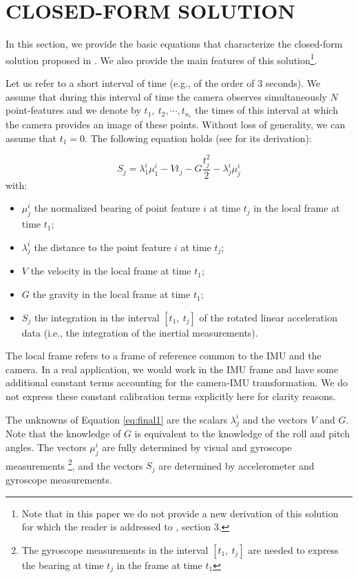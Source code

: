 \documentclass[letterpaper, 10 pt, conference]{ieeeconf}  %
\begin{document}
\section{CLOSED-FORM SOLUTION}\label{SectionCFS}

In this section, we provide the basic equations that characterize the closed-form solution proposed in  \cite{Martinelli2014}. We also provide the main features of this solution\footnote{Note that in this paper we do not provide a new derivation of this solution for which the reader is addressed to \cite{Martinelli2014}, section 3.}.

Let us refer to a short interval of time (e.g., of the order of $3$ seconds). We assume that during this interval of time the camera observes simultaneously $N$ point-features and we denote by $t_1,~t_2,\cdots,t_{n_i}$ the times of this interval at which the camera provides an image of these points. Without loss of generality, we can assume that $t_1=0$.
The following equation holds (see \cite{Martinelli2014} for its derivation):


\begin{equation} \label{eq:final1}
S_j = \lambda_1^i\mu_1^i - V t_j - G \frac{t_j^2}{2} - \lambda^i_j \mu^i_j
\end{equation}
\noindent with:
\begin{itemize}
\item $\mu_j^i$ the normalized bearing of point feature $i$ at time $t_j$ in the local frame at time $t_1$;
\item $\lambda_j^i$ the distance to the point feature $i$ at time $t_j$;
\item $V$ the velocity in the local frame at time $t_1$;
\item $G$ the gravity in the local frame  at time $t_1$;
\item $S_j$ the integration in the interval $[t_1, ~t_j]$ of the rotated linear acceleration data (i.e., the integration of the inertial measurements).
\end{itemize}


The local frame refers to a frame of reference common to the IMU and the camera.
In a real application, we would work in the IMU frame and have some additional constant terms
accounting for the camera-IMU transformation.
We do not express these constant calibration terms explicitly here for clarity reasons.

The unknowns of Equation \ref{eq:final1} are the scalars $\lambda_j^i$ and the vectors $V$ and $G$.
Note that the knowledge of $G$ is equivalent to the knowledge of the roll and pitch angles.
The vectors $\mu_j^i$ are fully determined by visual and gyroscope measurements \footnote{The gyroscope measurements in the interval $[t_1, ~t_j]$ are needed to express the bearing at time $t_j$ in the frame at time $t_1$},
and the vectors $S_j$ are determined by accelerometer and gyroscope measurements.
\end{document}
